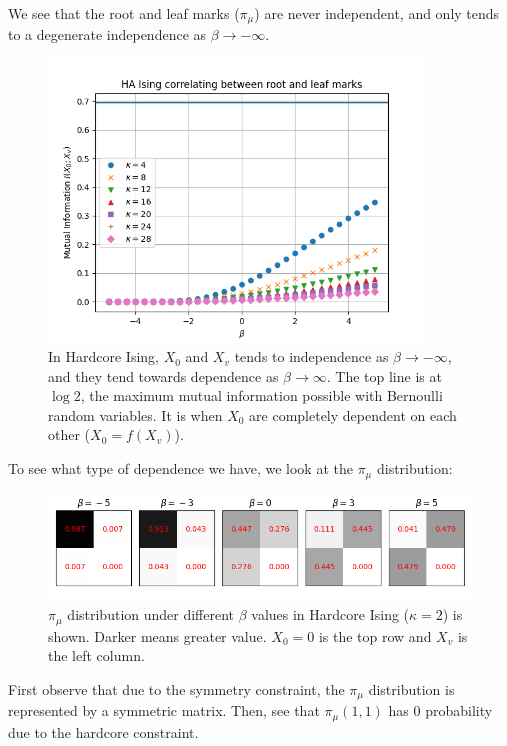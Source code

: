 \documentclass[12pt]{article}
\numberwithin{equation}{section}
\begin{document}
We see that the root and leaf marks ($\pi_\mu$) are never independent, and only tends to a degenerate independence as $\beta\rightarrow-\infty$.
\begin{figure}[h]
    \centering
    \includegraphics[width=10cm]{img/HA_Ising/RL_indep.png}
    \caption{In Hardcore Ising, $X_0$ and $X_v$ tends to independence as $\beta\rightarrow-\infty$, and they tend towards dependence as $\beta\rightarrow\infty$. The top line is at $\log 2$, the maximum mutual information possible with Bernoulli random variables.
        It is when $X_0$ are completely dependent on each other ($X_0=f(X_v)$).}
    \label{Fig.HAIS-RL-indep}
\end{figure}

To see what type of dependence we have, we look at the $\pi_\mu$ distribution:
\begin{figure}[h]
    \centering
    \includegraphics[width=15cm]{img/HA_Ising/RL_indiv.png}
    \caption{$\pi_\mu$ distribution under different $\beta$ values in Hardcore Ising ($\kappa=2$) is shown. Darker means greater value. $X_0=0$ is the top row and $X_v$ is the left column.}
    \label{Fig.HAIS-RL-beta-trends}
\end{figure}

First observe that due to the symmetry constraint, the $\pi_\mu$ distribution is represented by a symmetric matrix. Then, see that $\pi_\mu(1, 1)$ has $0$ probability due to the hardcore constraint.
\end{document}
